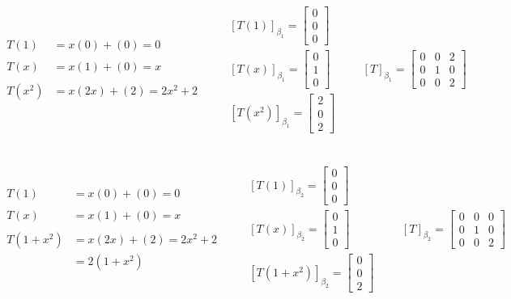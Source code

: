 \documentclass[]{article}
\newcommand{\bmat}[1]{\begin{bmatrix}#1\end{bmatrix}}
\begin{document}
	\section{}
	\subsection{}
	\begin{gather*}
		\begin{aligned}
			T(1) &= x(0) + (0) = 0\\
			\\
			T(x) &= x(1) + (0) = x\\
			\\
			T(x^2) &= x(2x) + (2) = 2x^2 + 2
		\end{aligned}
		\qquad
		\begin{aligned}
			[T(1)]_{\beta_1} = \bmat{0\\0\\0}\\
			[T(x)]_{\beta_1} = \bmat{0\\1\\0}\\
			[T(x^2)]_{\beta_1} = \bmat{2\\0\\2}
		\end{aligned}
		\qquad
		\boxed{[T]_{\beta_1} = \bmat{0&0&2\\0&1&0\\0&0&2}}
	\end{gather*}
	\subsection{}
	\begin{gather*}
		\begin{aligned}
			T(1) &= x(0) + (0) = 0\\\\
			T(x) &= x(1) + (0) = x\\\\
			T(1 + x^2) &= x(2x) + (2) = 2x^2 + 2\\&= 2(1 + x^2)
		\end{aligned}
		\qquad
		\begin{aligned}
			[T(1)]_{\beta_2} = \bmat{0\\0\\0}\\
			[T(x)]_{\beta_2} = \bmat{0\\1\\0}\\
			[T(1 + x^2)]_{\beta_2} = \bmat{0\\0\\2}
		\end{aligned}
		\qquad
		\boxed{[T]_{\beta_2} = \bmat{0&0&0\\0&1&0\\0&0&2}}
	\end{gather*}
\end{document}
